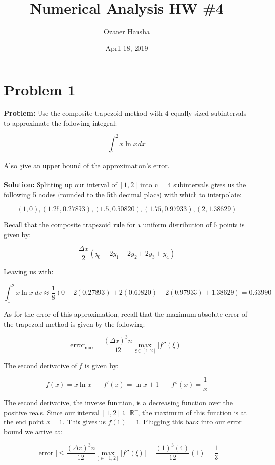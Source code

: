 \documentclass{article}
\begin{document}
\title{Numerical Analysis HW \#4}
\author{Ozaner Hansha}
\date{April 18, 2019}
\maketitle

\section*{Problem 1}
\textbf{Problem:} Use the composite trapezoid method with 4 equally sized subintervals to approximate the following integral:

$$\int^2_1 x\ln x\ dx$$

Also give an upper bound of the approximation's error.
\\\\
\textbf{Solution:} Splitting up our interval of $[1,2]$ into $n=4$ subintervals gives us the following 5 nodes (rounded to the 5th decimal place) with which to interpolate:

$$\left(1,0\right), \left(1.25,0.27893\right), \left(1.5,0.60820\right), \left(1.75,0.97933\right), \left(2,1.38629\right)$$

Recall that the composite trapezoid rule for a uniform distribution of 5 points is given by:

$$\frac{\Delta x}{2}\left(y_0+2y_1+2y_2+2y_3+y_4\right)$$

Leaving us with:

$$\int^2_1 x\ln x\ dx\approx\frac{1}{8}\left(0+2(0.27893)+2(0.60820)+2(0.97933)+1.38629\right)=\boxed{0.63990}$$

As for the error of this approximation, recall that the maximum absolute error of the trapezoid method is given by the following:

$$\operatorname{error_{\text{max}}}=\frac{(\Delta x)^3n}{12}\max_{\xi\in[1,2]}|f''(\xi)|$$

The second derivative of $f$ is given by:

$$f(x)=x\ln x\ \ \ \ \ \ \ \  f'(x)=\ln x + 1\ \ \ \ \ \ \ \  f''(x)=\frac{1}{x}$$

The second derivative, the inverse function, is a decreasing function over the positive reals. Since our interval $[1,2]\subseteq\mathbb R^+$, the maximum of this function is at the end point $x=1$. This gives us $f(1)=1$. Plugging this back into our error bound we arrive at:

$$|\operatorname{error}|\le \frac{(\Delta x)^3n}{12}\max_{\xi\in[1,2]}|f''(\xi)|=\frac{(1)^3(4)}{12}(1)=\boxed{\frac{1}{3}}$$
\end{document}
